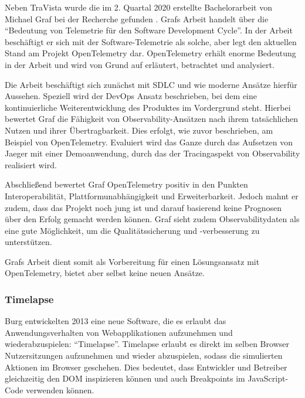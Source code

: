 
Neben TraVista wurde die im 2. Quartal 2020 erstellte Bachelorarbeit von Michael Graf bei der Recherche gefunden \cite{MichaelGrafBA}. Grafs Arbeit handelt über die \enquote{Bedeutung von Telemetrie für den Software Development Cycle}. In der Arbeit beschäftigt er sich mit der Software-Telemetrie als solche, aber legt den aktuellen Stand am Projekt OpenTelemetry dar. OpenTelemetry erhält enorme Bedeutung in der Arbeit und wird von Grund auf erläutert, betrachtet und analysiert.

Die Arbeit beschäftigt sich zunächst mit SDLC und wie moderne Ansätze hierfür Aussehen. Speziell wird der DevOps Ansatz beschrieben, bei dem eine kontinuierliche Weiterentwicklung des Produktes im Vordergrund steht. Hierbei bewertet Graf die Fähigkeit von Observability-Ansätzen nach ihrem tatsächlichen Nutzen und ihrer Übertragbarkeit. Dies erfolgt, wie zuvor beschrieben, am Beispiel von OpenTelemetry. Evaluiert wird das Ganze durch das Aufsetzen von Jaeger mit einer Demoanwendung, durch das der Tracingaspekt von Observability realisiert wird.

Abschließend bewertet Graf OpenTelemetry positiv in den Punkten Interoperabilität, Plattformunabhängigkeit und Erweiterbarkeit. Jedoch mahnt er zudem, dass das Projekt noch jung ist und darauf basierend keine Prognosen über den Erfolg gemacht werden können. Graf sieht zudem Observabilitydaten als eine gute Möglichkeit, um die Qualitätssicherung und -verbesserung zu unterstützen.

Grafs Arbeit dient somit als Vorbereitung für einen Lösungsansatz mit OpenTelemetry, bietet aber selbst keine neuen Ansätze.

\subsubsection{Timelapse}

Burg \etal \cite{TimelapsePaper} entwickelten 2013 eine neue Software, die es erlaubt das Anwendungsverhalten von Webapplikationen aufzunehmen und wiederabzuspielen: \enquote{Timelapse}. Timelapse erlaubt es direkt im selben Browser Nutzersitzungen aufzunehmen und wieder abzuspielen, sodass die simulierten Aktionen im Browser geschehen. Dies bedeutet, dass Entwickler und Betreiber gleichzeitig den DOM inspizieren können und auch Breakpoints im JavaScript-Code verwenden können.


